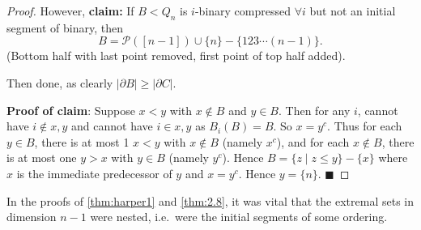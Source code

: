 \documentclass{article}
\begin{document}
\begin{proof}
  However, \textbf{claim:} If $B< Q_n$ is $i$-binary compressed $\forall i$ but not an initial segment of binary, then
  \begin{equation*}B = \mathcal{P}([n-1]) \cup \{n\} - \{123\dotsm(n-1)\}.\end{equation*}
  (Bottom half with last point removed, first point of top half added).
  \begin{center}
  \end{center}
  Then done, as clearly $|\partial B| \geq |\partial C|$.

  \textbf{Proof of claim}:
  Suppose $x < y$ with $x \notin B$ and $y \in B$.
  Then for any $i$, cannot have $i \notin x,y$ and cannot have $i \in x,y$ as $B_i(B) = B$.
  So $x = y^c$.
  Thus for each $y \in B$, there is at most 1 $x < y$ with $x \notin B$ (namely $x^c$), and for each $x \notin B$, there is at most one $y > x$ with $y \in B$ (namely $y^c$).
  Hence $B = \{z \mid z \leq y\} - \{x\}$ where $x$ is the immediate predecessor of $y$ and $x = y^c$.
  Hence $y = \{n\}$. $\blacksquare$
\end{proof}
\begin{remark}
  In the proofs of \cref{thm:harper1} and \cref{thm:2.8}, it was vital that the extremal sets in dimension $n-1$ were nested, i.e.\ were the initial segments of some ordering.
\end{remark}
\end{document}
